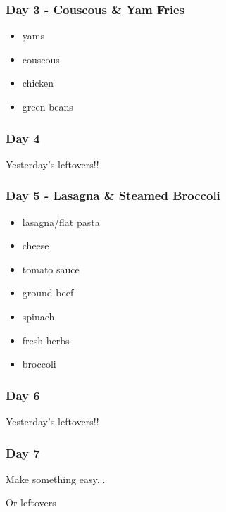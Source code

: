 \documentclass[11pt, a4paper]{article}
\begin{document}
\subsubsection{Day 3 - Couscous \& Yam Fries}
\vspace{1pc}
\begin{itemize}
\item yams
\item couscous
\item chicken 
\item green beans
\end{itemize}

\subsubsection{Day 4}
\vspace{1pc}
Yesterday's leftovers!!

\subsubsection{Day 5 - Lasagna \& Steamed Broccoli}
\vspace{1pc}
\begin{itemize}
\item lasagna/flat pasta
\item cheese
\item tomato sauce
\item ground beef
\item spinach
\item fresh herbs
\item broccoli
\end{itemize}

\subsubsection{Day 6}
\vspace{1pc}
Yesterday's leftovers!!

\subsubsection{Day 7}
\vspace{1pc}
\noindent Make something easy...
\par
Or leftovers
\end{document}
